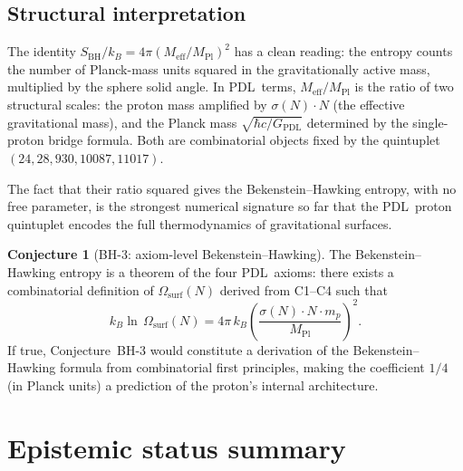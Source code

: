 \documentclass[11pt,a4paper]{article}
\theoremstyle{definition}
\newtheorem{conjecture}[theorem]{Conjecture}
\newcommand{\PDL}{\textnormal{PDL}}
\newcommand{\sig}{\sigma}
\newcommand{\GPDL}{G_{\mathrm{PDL}}}
\newcommand{\hb}{\hbar}
\newcommand{\SBH}{S_{\mathrm{BH}}}
\newcommand{\Meff}{M_{\mathrm{eff}}}
\newcommand{\MPl}{M_{\mathrm{Pl}}}
\newcommand{\Omsurf}{\Omega_{\mathrm{surf}}}
\begin{document}
\subsection{Structural interpretation}

The identity $\SBH/k_B = 4\pi(\Meff/\MPl)^2$ has a clean reading: the entropy
counts the number of Planck-mass units squared in the gravitationally active
mass, multiplied by the sphere solid angle. In \PDL\ terms, $\Meff/\MPl$ is
the ratio of two structural scales: the proton mass amplified by $\sig(N)\cdot N$
(the effective gravitational mass), and the Planck mass $\sqrt{\hb c/\GPDL}$
determined by the single-proton bridge formula. Both are combinatorial objects
fixed by the quintuplet $(24,28,930,10087,11017)$.

The fact that their ratio squared gives the Bekenstein--Hawking entropy, with
no free parameter, is the strongest numerical signature so far that the \PDL\
proton quintuplet encodes the full thermodynamics of gravitational surfaces.

\begin{conjecture}[BH-3: axiom-level Bekenstein--Hawking]
\label{conj:BH3}
The Bekenstein--Hawking entropy is a theorem of the four \PDL\ axioms: there
exists a combinatorial definition of $\Omsurf(N)$ derived from C1--C4 such that
\begin{equation}
k_B\ln\,\Omsurf(N) = 4\pi\,k_B\left(\frac{\sig(N)\cdot N\cdot m_p}{\MPl}\right)^2.
\label{eq:BH3}
\end{equation}
If true, Conjecture~BH-3 would constitute a derivation of the Bekenstein--Hawking
formula from combinatorial first principles, making the coefficient $1/4$ (in
Planck units) a prediction of the proton's internal architecture.
\end{conjecture}

\section{Epistemic status summary}
\label{sec:epistemic}
\end{document}
